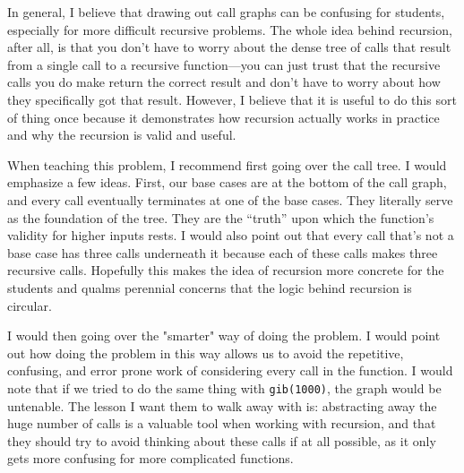 \begin{questionmeta}
In general, I believe that drawing out call graphs can be confusing for students, especially for more difficult recursive problems. The whole idea behind recursion, after all, is that you don't have to worry about the dense tree of calls that result from a single call to a recursive function---you can just trust that the recursive calls you do make return the correct result and don't have to worry about how they specifically got that result. However, I believe that it is useful to do this sort of thing once because it demonstrates how recursion actually works in practice and why the recursion is valid and useful.

When teaching this problem, I recommend first going over the call tree. I would emphasize a few ideas. First, our base cases are at the bottom of the call graph, and every call eventually terminates at one of the base cases. They literally serve as the foundation of the tree. They are the ``truth'' upon which the function's validity for higher inputs rests. I would also point out that every call that's not a base case has three calls underneath it because each of these calls makes three recursive calls. Hopefully this makes the idea of recursion more concrete for the students and qualms perennial concerns that the logic behind recursion is circular. 

I would then going over the "smarter" way of doing the problem. I would point out how doing the problem in this way allows us to avoid the repetitive, confusing, and error prone work of considering every call in the function. I would note that if we tried to do the same thing with \lstinline{gib(1000)}, the graph would be untenable. The lesson I want them to walk away with is: abstracting away the huge number of calls is a valuable tool when working with recursion, and that they should try to avoid thinking about these calls if at all possible, as it only gets more confusing for more complicated functions. 
\end{questionmeta}